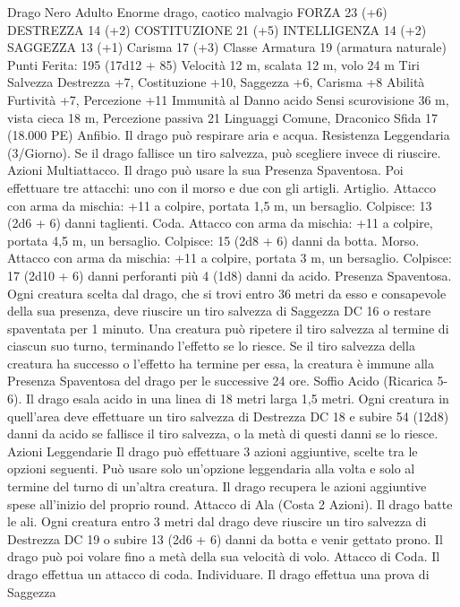 \begin{multicols}{2}
Drago Nero Adulto
Enorme drago, caotico malvagio
FORZA 23 (+6)
DESTREZZA 14 (+2)
COSTITUZIONE 21 (+5)
INTELLIGENZA 14 (+2)
SAGGEZZA 13 (+1)
Carisma 17 (+3)
Classe Armatura 19 (armatura naturale)
\hspace*{0pt}\hfill{Punti Ferita}: 195 (17d12 + 85)
Velocità 12 m, scalata 12 m, volo 24 m
Tiri Salvezza Destrezza +7, Costituzione +10, Saggezza +6,
Carisma +8
Abilità Furtività +7, Percezione +11
Immunità al Danno acido
Sensi scurovisione 36 m, vista cieca 18 m, Percezione passiva 21
Linguaggi Comune, Draconico
Sfida 17 (18.000 PE)
Anfibio. Il drago può respirare aria e acqua.
Resistenza Leggendaria (3/Giorno). Se il drago fallisce un tiro
salvezza, può scegliere invece di riuscire.
Azioni
Multiattacco. Il drago può usare la sua Presenza Spaventosa. Poi
effettuare tre attacchi: uno con il morso e due con gli artigli.
Artiglio. Attacco con arma da mischia: +11 a colpire, portata 1,5
m, un bersaglio.
Colpisce: 13 (2d6 + 6) danni taglienti.
Coda. Attacco con arma da mischia: +11 a colpire, portata 4,5
m, un bersaglio.
Colpisce: 15 (2d8 + 6) danni da botta.
Morso. Attacco con arma da mischia: +11 a colpire, portata 3 m,
un bersaglio.
Colpisce: 17 (2d10 + 6) danni perforanti più 4 (1d8) danni da
acido.
Presenza Spaventosa. Ogni creatura scelta dal drago, che si trovi
entro 36 metri da esso e consapevole della sua presenza, deve
riuscire un tiro salvezza di Saggezza DC 16 o restare spaventata
per 1 minuto. Una creatura può ripetere il tiro salvezza al termine
di ciascun suo turno, terminando l’effetto se lo riesce. Se il tiro
salvezza della creatura ha successo o l’effetto ha termine per
essa, la creatura è immune alla Presenza Spaventosa del drago
per le successive 24 ore.
Soffio Acido (Ricarica 5-6). Il drago esala acido in una linea di
18 metri larga 1,5 metri. Ogni creatura in quell’area deve
effettuare un tiro salvezza di Destrezza DC 18 e subire 54 (12d8)
danni da acido se fallisce il tiro salvezza, o la metà di questi
danni se lo riesce.
Azioni Leggendarie
Il drago può effettuare 3 azioni aggiuntive, scelte tra le opzioni
seguenti. Può usare solo un’opzione leggendaria alla volta e solo
al termine del turno di un’altra creatura. Il drago recupera le
azioni aggiuntive spese all’inizio del proprio round.
Attacco di Ala (Costa 2 Azioni). Il drago batte le ali. Ogni
creatura entro 3 metri dal drago deve riuscire un tiro salvezza di
Destrezza DC 19 o subire 13 (2d6 + 6) danni da botta e venir
gettato prono. Il drago può poi volare fino a metà della sua
velocità di volo.
Attacco di Coda. Il drago effettua un attacco di coda.
Individuare. Il drago effettua una prova di Saggezza

\end{multicols}
